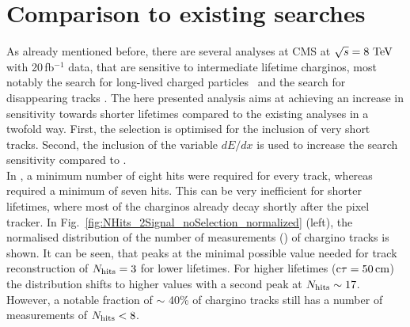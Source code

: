 \section{Comparison to existing searches}
As already mentioned before, there are several analyses at CMS at $\sqrt{s}=8\,\,\text{Te}\kern-0.06667em\text{V}$ with 20\,fb$^{-1}$ data, that are sensitive to intermediate lifetime charginos, most notably the search for long-lived charged \mbox{particles \cite{bib:CMS:HSCP_8TeV}} and the search for disappearing tracks \cite{bib:CMS:DT_8TeV}.
The here presented analysis aims at achieving an increase in sensitivity towards shorter lifetimes compared to the existing analyses in a twofold way.
First, the selection is optimised for the inclusion of very short tracks.
Second, the inclusion of the variable $dE/dx$ is used to increase the search sensitivity compared to \cite{bib:CMS:DT_8TeV}.\\

In \cite{bib:CMS:HSCP_8TeV}, a minimum number of eight hits were required for every track, whereas \cite{bib:CMS:DT_8TeV} required a minimum of seven hits.
This can be very inefficient for shorter lifetimes, where most of the charginos already decay shortly after the pixel tracker.
In Fig.~\ref{fig:NHits_2Signal_noSelection_normalized} (left), the normalised distribution of the number of measurements (\nhits) of chargino tracks is shown. 
It can be seen, that \nhits peaks at the minimal possible value needed for track reconstruction of $N_{\text{hits}}=3$ for lower lifetimes.
For higher lifetimes ($\text{c}\tau=50\,\text{cm}$) the distribution shifts to higher values with a second peak at $N_{\text{hits}}\sim17$.
However, a notable fraction of $\sim$ 40\% of chargino tracks still has a number of measurements of $N_{\text{hits}}<8$. 

